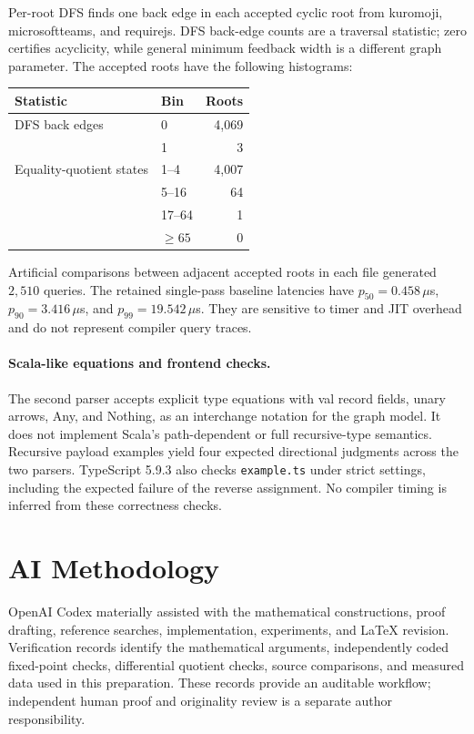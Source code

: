 \documentclass[11pt,letterpaper]{article}
\theoremstyle{definition}\newtheorem{definition}[theorem]{Definition}
\begin{document}
Per-root DFS finds one back edge in each accepted cyclic root from kuromoji, microsoftteams, and requirejs. DFS back-edge counts are a traversal statistic; zero certifies acyclicity, while general minimum feedback width is a different graph parameter. The accepted roots have the following histograms:
\begin{center}
\begin{tabular}{llr}\toprule
Statistic & Bin & Roots\\\midrule
DFS back edges & 0 & 4,069\\
 & 1 & 3\\\midrule
Equality-quotient states & 1--4 & 4,007\\
 & 5--16 & 64\\
 & 17--64 & 1\\
 & $\ge65$ & 0\\\bottomrule
\end{tabular}
\end{center}
Artificial comparisons between adjacent accepted roots in each file generated $2,510$ queries. The retained single-pass baseline latencies have $p_{50}=0.458\,\mu$s, $p_{90}=3.416\,\mu$s, and $p_{99}=19.542\,\mu$s. They are sensitive to timer and JIT overhead and do not represent compiler query traces.

\paragraph{Scala-like equations and frontend checks.}
The second parser accepts explicit type equations with val record fields, unary arrows, Any, and Nothing, as an interchange notation for the graph model. It does not implement Scala's path-dependent or full recursive-type semantics. Recursive payload examples yield four expected directional judgments across the two parsers. TypeScript 5.9.3 also checks \texttt{example.ts} under strict settings, including the expected failure of the reverse assignment. No compiler timing is inferred from these correctness checks.

\section*{AI Methodology}
OpenAI Codex materially assisted with the mathematical constructions, proof drafting, reference searches, implementation, experiments, and LaTeX revision. Verification records identify the mathematical arguments, independently coded fixed-point checks, differential quotient checks, source comparisons, and measured data used in this preparation. These records provide an auditable workflow; independent human proof and originality review is a separate author responsibility.

\clearpage


\end{document}
